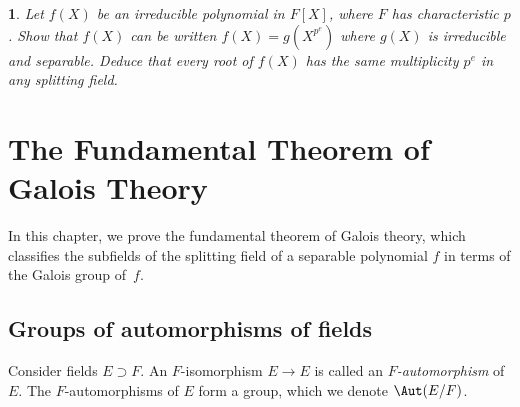 \documentclass[a4paper,11pt,final,openany]{memoir}
\newtheorem{exercise}[Y]{}
\theoremstyle{nonumberplain}
\begin{document}
\begin{exercise}
\label{x10} Let $f(X)$ be an irreducible polynomial in $F[X]$, where $F$ has
characteristic $p$. Show that $f(X)$ can be written $f(X)=g(X^{p^{e}})$ where
$g(X)$ is irreducible and separable. Deduce that every root of $f(X)$ has the
same multiplicity $p^{e}$ in any splitting field.
\end{exercise}

\clearpage


\chapter{The Fundamental Theorem of Galois Theory}

In this chapter, we prove the fundamental theorem of Galois theory, which
classifies the subfields of the splitting field of a separable polynomial $f$
in terms of the Galois group of~$f$.

\section{Groups of automorphisms of fields}

Consider fields $E\supset F$. An $F$-isomorphism $E\rightarrow E$ is called an
$F$\emph{-automorphism}%
of $E$. The $F$-automorphisms of $E$ form a group, which we denote $\Aut(E/F)$.
\end{document}
